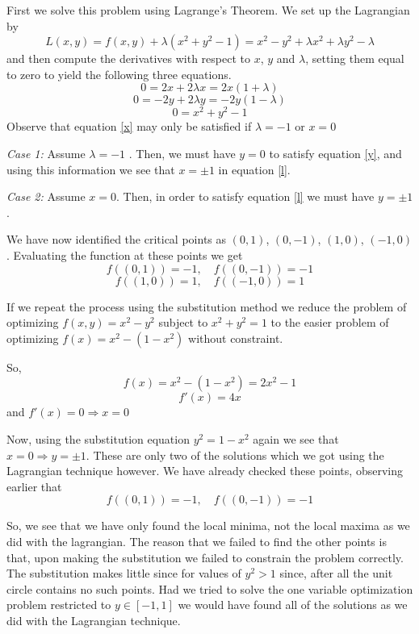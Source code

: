 \documentclass[12pt]{article}
\begin{document}
First we solve this problem using Lagrange's Theorem. We set up the Lagrangian by 
\[L(x,y)=f(x,y)+\lambda (x^2+y^2 -1) = x^2-y^2+\lambda x^2+\lambda y^2-\lambda\]
and then compute the derivatives with respect to $x$, $y$ and $\lambda$, setting them equal to zero to yield the following three equations.
\begin{equation}\label{x}0=2x+2\lambda x = 2x (1+\lambda)\end{equation}
\begin{equation}\label{y}0= -2y+2 \lambda y= -2y(1 - \lambda )\end{equation}
\begin{equation}\label{l} 0=x^2+y^2-1\end{equation}
Observe that equation \ref{x} may only be satisfied if $\lambda = -1$ or $x=0$

\emph{Case 1:} Assume  $\lambda = -1$ . Then, we must have $y=0$ to satisfy equation \ref{y}, and using this information we see that $x=\pm 1$ in equation \ref{l}.

\emph{Case 2:} Assume $x=0$. Then, in order to satisfy equation \ref{l} we must have $y=\pm1$.

We have now identified the critical points as $(0,1)$, $(0,-1)$, $(1,0)$, $(-1,0)$. Evaluating the function at these points we get
\[f((0,1))=-1,\quad f((0,-1))= -1\]
\[f((1,0))=1,\quad  f((-1,0))=1\]

If we repeat the process using  the substitution method we reduce the problem of optimizing $f(x,y)=x^2-y^2$ subject to  $x^2+y^2=1$  to the easier problem of optimizing $f(x)=x^2-(1-x^2)$ without constraint.

So, 
\[f(x)=x^2-(1-x^2)=2x^2-1\]
\[f'(x)=4x\]
and $f'(x)=0 \Rightarrow x=0$

Now, using the substitution equation $y^2=1-x^2$ again we see that $x=0\Rightarrow y=\pm 1$. These are only two of the solutions which we got using the Lagrangian technique however. We have already checked these points, observing earlier that
\[f((0,1))=-1,\quad f((0,-1))= -1\]

So, we see that we have only found the local minima, not the local maxima as we did with the lagrangian. The reason that we failed to find the other points is that, upon making the substitution we failed to constrain the problem correctly. The substitution makes little since for values of $y^2 > 1$ since, after all the unit circle contains no such points. Had we tried to solve the one variable optimization problem restricted to $y \in [-1,1]$ we would have found all of the solutions as we did with the Lagrangian technique.
\end{document}

